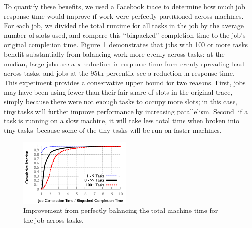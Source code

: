 
To quantify these benefits, we used a Facebook trace to determine how much
job response time would improve if work were perfectly partitioned across
machines. For each job, we divided the total runtime for all tasks in the
job by the average number of slots used, and compare this ``binpacked''
completion time to the job's original completion time.
Figure~\ref{fig:binpacked}
demonstrates that jobs with 100 or more tasks benefit substantially from
balancing work more evenly across tasks: at the median, large jobs see
a x reduction in response time from evenly spreading load
across tasks, and
jobs at the 95th percentile see a  reduction in response time.
This experiment provides a conservative upper bound for two reasons. First, jobs
may have been using fewer than their fair share of slots in the original trace,
simply because there were not enough tasks to occupy more slots; in this case,
tiny tasks will further improve performance by increasing parallelism. Second,
if a task is running on a slow machine, it will take less total time when
broken into tiny tasks, because some of the tiny tasks will be run on faster
machines.

\begin{figure}[!t]
\centering
\hspace{2ex}
\includegraphics[width=0.5\textwidth]{figures/binpacked1-sep}
\vspace{-4ex}
\caption{Improvement from perfectly balancing the total machine time for the 
job across tasks.}
\vspace{-2ex}
\label{fig:binpacked}
\end{figure}



